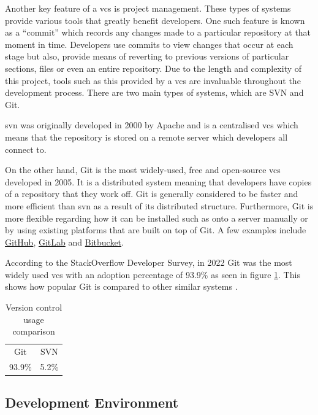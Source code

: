 \documentclass[11pt]{article}
\begin{document}
Another key feature of a \gls*{vcs} is project management. These types of
systems provide various tools that greatly benefit developers. One such feature
is known as a ``commit'' which records any changes made to a particular
repository at that moment in time. Developers use commits to view changes that
occur at each stage but also, provide means of reverting to previous versions of
particular sections, files or even an entire repository. Due to the length and
complexity of this project, tools such as this provided by a \gls*{vcs} are
invaluable throughout the development process. There are two main types of
systems, which are SVN and Git. 


\gls*{svn} was originally developed in 2000 by Apache and is a centralised
\gls*{vcs} which means that the repository is stored on a remote server which
developers all connect to.

On the other hand, Git is the most widely-used, free and open-source \gls*{vcs}
developed in 2005. It is a distributed system meaning that developers have
copies of a repository that they work off. Git is generally considered to be
faster and more efficient than \gls*{svn} as a result of its distributed
structure. Furthermore, Git is more flexible regarding how it can be
installed such as onto a server manually or by using existing platforms that are
built on top of Git. A few examples include \href{http://github.com}{GitHub},
\href{http://gitlab.com}{GitLab} and \href{https://bitbucket.org/}{Bitbucket}. 


According to the StackOverflow Developer Survey, in 2022 Git was the most widely used \gls*{vcs}
with an adoption percentage of 93.9\% as seen in figure \ref{tab:vcs_comparison}.
This shows how popular Git is compared to other similar systems \cite{vcs_survey}.

\begin{table}[H]
\begin{center}
  \begin{tabular}{cc}
    
    \rowcolor{gray!50}
    Git & SVN \\
    93.9\% & 5.2\% \\
  \end{tabular}
\end{center}
\caption{Version control usage comparison}
\label{tab:vcs_comparison}
\end{table}

\subsection{Development Environment}
\end{document}
